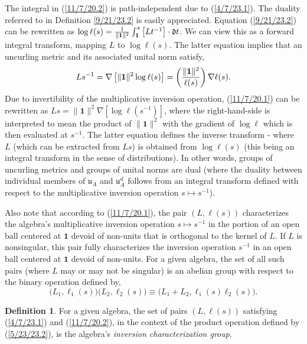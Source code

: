 \documentclass{amsart}
\numberwithin{equation}{section}
\theoremstyle{definition}
\newtheorem{definition}[theorem]{Definition}
\numberwithin{theorem}{section}
\begin{document}
   
The integral in (\ref{11/7/20.2}) is path-independent due to (\ref{4/7/23.1}).  The duality referred to in Definition \ref{9/21/23.2} is easily appreciated.  Equation (\ref{9/21/23.2}) can be rewritten as  \mbox{$\log\ell(s) = \frac{1}{\|\mathbf{1}\|^2}\int_{{\bf 1}}^{s} \left[L t^{-1}\right]\cdot \mathfrak{d}t$.}   We can view this as a forward integral transform, mapping $L$ to $\log \ell(s)$.   The latter equation implies that an uncurling metric and its associated unital norm satisfy,  \begin{equation}\label{11/7/20.1} Ls^{-1}  = \nabla\left[\|{\bf 1}\|^2\log  \ell(s)\right] =   \left(\frac{\|{\bf 1}\|^2}{ \ell(s)}\right)\nabla \ell(s).\end{equation}  Due to invertibility of the multiplicative inversion operation,  (\ref{11/7/20.1}) can be rewritten as  $Ls = \|\mathbf{1}\|^2 \nabla\left[\log \ell(s^{-1})\right]$, where the right-hand-side is interpreted to mean the product of $\|\mathbf{1}\|^2$ with the gradient of $\log \ell$ which is then evaluated at $s^{-1}$.  The latter equation defines the inverse transform - where $L$ (which can be extracted from $Ls$) is obtained from $\log\ell(s)$ (this being an integral transform in the sense of distributions).  
In other words, groups of uncurling metrics and groups of unital norms are dual (where the duality between individual members of  $\mathfrak{u}_A$ and $\mathfrak{u}_A^d$ follows from an integral transform defined with respect to the multiplicative inversion operation $s\mapsto s^{-1}$).
   
    
Also note that according to (\ref{11/7/20.1}), the pair $(L, \ell(s))$ characterizes the algebra's multiplicative inversion operation $s\mapsto s^{-1}$ in the portion of an open ball centered at $\mathbf{1}$ devoid of non-units that is orthogonal to the kernel of $L$.  If $L$ is nonsingular, this pair fully characterizes the inversion operation $s^{-1}$ in an open ball centered at $\mathbf{1}$ devoid of non-units.  For a given algebra, the set of all such pairs (where $L$ may or may not be singular) is an abelian group with respect to the binary operation defined by,
\begin{equation}\label{5/23/23.2} \big(L_1, \ell_1(s)\big)\big(L_2, \ell_2(s)\big) \equiv 
\big(L_1+L_2, \ell_1(s)  \ell_2(s)\big).\end{equation} 
\begin{definition} For a given algebra, the set of pairs $(L, \ell(s))$ satisfying (\ref{4/7/23.1}) and (\ref{11/7/20.2}), in the context of the product operation defined by (\ref{5/23/23.2}), is the algebra's {\it inversion characterization group}. \end{definition}
\end{document}
